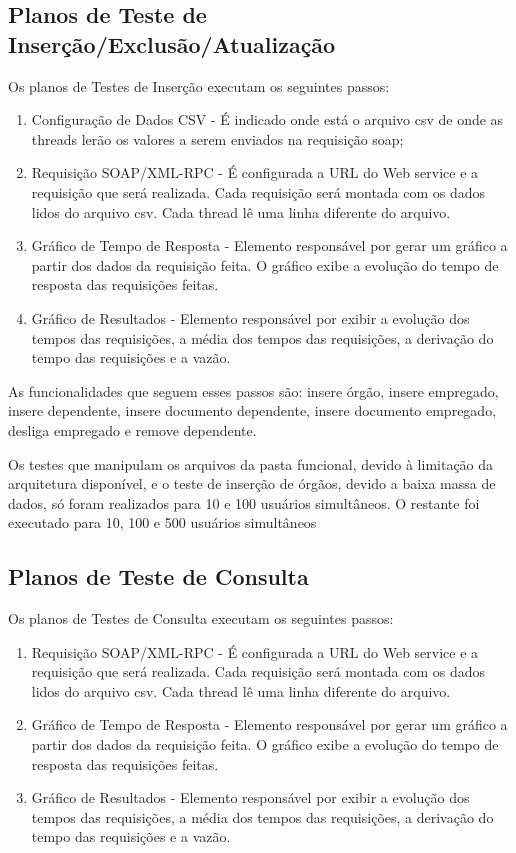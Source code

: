 \subsection{Planos de Teste de Inserção/Exclusão/Atualização}

Os planos de Testes de Inserção executam os seguintes passos:

\begin{enumerate}
\item Configuração de Dados CSV - É indicado onde está o arquivo csv de onde as threads lerão os valores a serem enviados na requisição soap;
\item Requisição SOAP/XML-RPC - É configurada a URL do Web service e a requisição que será realizada. Cada requisição será montada com os dados lidos do arquivo csv. Cada thread lê uma linha diferente do arquivo.
\item Gráfico de Tempo de Resposta -  Elemento responsável por gerar um gráfico a partir dos dados da requisição feita. O gráfico exibe a  evolução do tempo de resposta das requisições feitas.
\item Gráfico de Resultados - Elemento responsável por exibir a evolução dos tempos das requisições, a média dos tempos das requisições, a derivação do tempo das requisições e a vazão.
\end{enumerate}

As funcionalidades que seguem esses passos são: insere órgão, insere empregado, insere dependente, insere documento dependente, insere documento empregado, desliga empregado e remove dependente.

Os testes que manipulam os arquivos da pasta funcional, devido à limitação da arquitetura disponível, e o teste de inserção de órgãos, devido a baixa massa de dados, só foram realizados para 10 e 100 usuários simultâneos. O restante foi executado para 10, 100 e 500 usuários simultâneos

\subsection{Planos de Teste de Consulta}

Os planos de Testes de Consulta executam os seguintes passos:

\begin{enumerate}
\item Requisição SOAP/XML-RPC - É configurada a URL do Web service e a requisição que será realizada. Cada requisição será montada com os dados lidos do arquivo csv. Cada thread lê uma linha diferente do arquivo.
\item Gráfico de Tempo de Resposta -  Elemento responsável por gerar um gráfico a partir dos dados da requisição feita. O gráfico exibe a  evolução do tempo de resposta das requisições feitas.
\item Gráfico de Resultados - Elemento responsável por exibir a evolução dos tempos das requisições, a média dos tempos das requisições, a derivação do tempo das requisições e a vazão.
\end{enumerate}

